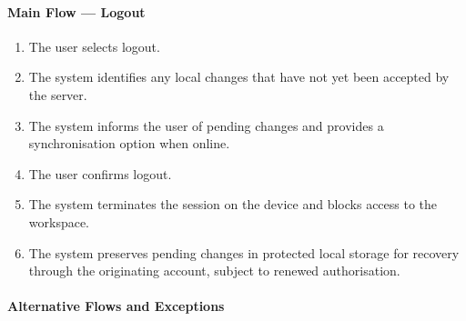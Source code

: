 \paragraph{Main Flow --- Logout}

\begin{enumerate}
        \item The user selects logout.
        \item The system identifies any local changes that
        have not yet been accepted by the server.
        \item The system informs the user of pending changes
        and provides a synchronisation option when online.
        \item The user confirms logout.
        \item The system terminates the session on the device
        and blocks access to the workspace.
        \item The system preserves pending changes in protected
        local storage for recovery through the originating
        account, subject to renewed authorisation.
    \end{enumerate}

\paragraph{Alternative Flows and Exceptions}

